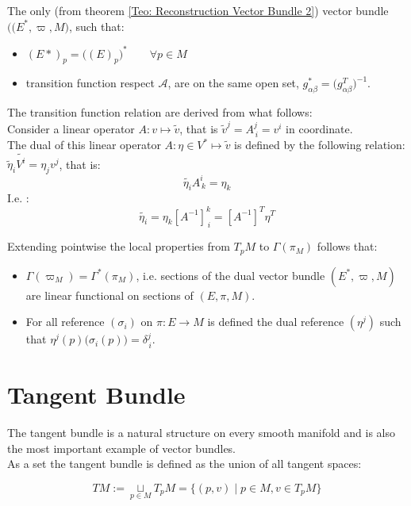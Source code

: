 \documentclass[a4paper,12pt]{scrartcl}    %
\begin{document}
\begin{definition}\label{Def: Dual vector bundle}
	The only (from theorem \ref{Teo: Reconstruction Vector Bundle 2}) vector bundle $\big( (E^*, \varpi,M \big)$, such that:
	\begin{itemize}
		\item $(E* ) _p = \big(( E)_p \big) ^* \qquad \forall p \in M$
		\item transition function respect $\mathcal{A}$, are on the same open set, $g^*_{\alpha \beta} =\big( g_{\alpha	\beta}^T \big)^{-1}$.
	\end{itemize}
\end{definition}
\begin{observation}
	The transition function relation are derived from what follows:
	\\
	Consider a linear operator $ A: v \mapsto\tilde{v}$, that is $\tilde{v}^j = A^j_{\, i} = v^i$  in coordinate.
	\\
	The dual of this linear operator $ A : \eta \in V^* \mapsto \tilde{v}$ is defined by the following relation: $\tilde{\eta}_i \tilde{V^i} = \eta_j v^j $, that is:
	\begin{displaymath}
		\tilde{\eta_i} A^i_{\, k} = \eta_k
	\end{displaymath}
	I.e. :
	\begin{displaymath}
		\tilde{\eta_i}= \eta_k [A^{-1} ]^k_{\, i} =[A^{-1} ]^T \eta^T
	\end{displaymath}
\end{observation}

\begin{observation}
Extending pointwise the local properties from $T_pM$ to $\Gamma(\pi_M)$ follows that:
	\begin{itemize}
		\item $\Gamma(\varpi_M) = \Gamma^*(\pi_M)$, i.e. sections of the dual vector bundle $(E^*, \varpi, M)$ are linear functional on sections of $(E, \pi, M)$.
		\item For all reference $(\sigma_i)$ on $\pi:E\rightarrow M$ is defined the dual reference $(\eta^j)$ such that $ \eta^j(p) \big(\sigma_i(p)\big)= \delta^j_{\, i}$.
	\end{itemize}
\end{observation}



\newpage
\section{Tangent Bundle}
 The tangent bundle is a natural structure on every smooth manifold and is also the most important example of vector bundles.
\vspace{6mm}
\\
As a set the tangent bundle is defined as the union of all tangent spaces:
\begin{definition}
\begin{displaymath}
TM := \underset{p \in M}{\sqcup} T_{p}M = \{ (p,v) \; \big\vert \; p\in M, v \in T_pM \}
\end{displaymath}
\end{definition}
\end{document}

